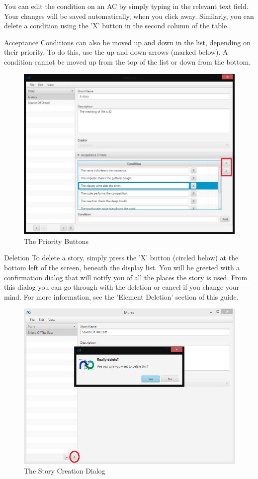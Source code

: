 You can edit the condition on an AC by simply typing in the relevant text field. Your changes will be saved automatically, when you click away. Similarly, you can delete a condition using the 'X' button in the second column of the table.
\newline\newline

Acceptance Conditions can also be moved up and down in the list, depending on their priority. To do this, use the up and down arrows (marked below). A condition cannot be moved up from the top of the list or down from the bottom.

\begin{figure}[H]
\centering
\includegraphics[width=\textwidth]{images/screenshots/AcceptanceCriteria3.PNG}
\caption{The Priority Buttons}
\label{fig:new_project}
\end{figure}

Deletion
To delete a story, simply press the 'X' button (circled below) at the bottom left of the screen, beneath the display list. You will be greeted with a confirmation dialog that will notify you of all the places the story is used. From this dialog you can go through with the deletion or cancel if you change your mind. For more information, see the 'Element Deletion' section of this guide.

\begin{figure}[H]
\centering
\includegraphics[width=\textwidth]{images/screenshots/stories5.PNG}
\caption{The Story Creation Dialog}
\label{fig:new_project}
\end{figure}